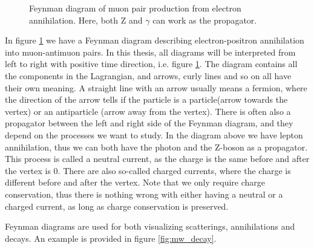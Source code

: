 \begin{figure}[h!]
    \centering
    
    \caption[Electron scattering diagram]{Feynman diagram of muon pair production from electron annihilation. Here, both Z and $\gamma$ can work as the propagator.}
    \label{fig:eemm_scat}
\end{figure}

In figure \ref{fig:eemm_scat} we have a Feynman diagram describing electron-positron annihilation into muon-antimuon pairs. In this thesis, all 
diagrams will be interpreted from left to right with positive time direction, i.e. figure \ref{fig:eemm_scat}.
The diagram contains all the components in the Lagrangian, and arrows, curly lines and so on all have their own meaning. A straight line with 
an arrow usually means a fermion, where the direction of the arrow tells if the particle is a particle(arrow towards the vertex) or an antiparticle (arrow away from the vertex). 
There is often also a propagator between the left and right side of the Feynman diagram, 
and they depend on the processes we want to study. In the diagram above we have lepton annihilation, thus we can both have the photon and the 
Z-boson as a propagator. This process is called a neutral current\cite{Pich:819632}, as the charge is the same before and after the vertex is 0. 
There are also so-called charged currents, where the charge is different before and after the vertex. Note that we only require charge conservation,
thus there is nothing wrong with either having a neutral or a charged current, as long as charge conservation is preserved. \par 
Feynman diagrams are used for both visualizing scatterings, annihilations and decays. An example is provided in figure \ref{fig:mw_decay}. 

